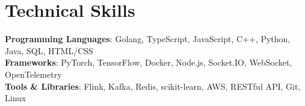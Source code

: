 \section{Technical Skills}
 \begin{itemize}[leftmargin=0.15in, label={}]
    \small{\item{
     \textbf{Programming Languages}{: Golang, TypeScript, JavaScript, C++, Python, Java,  SQL, HTML/CSS} \\
     \textbf{Frameworks}{: PyTorch, TensorFlow, Docker, Node.js, Socket.IO, WebSocket, OpenTelemetry } \\
     \textbf{Tools \& Libraries}{: Flink, Kafka, Redis, scikit-learn, AWS, RESTful API, Git, Linux} \\
    }}
 \end{itemize}